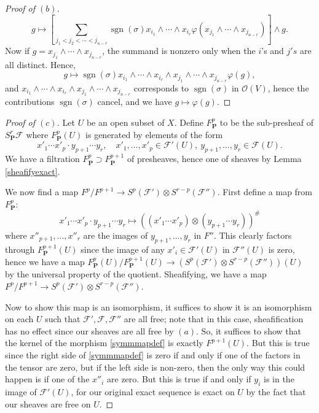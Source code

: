 \documentclass[10pt]{article}
\theoremstyle{definition}
\theoremstyle{remark}
\numberwithin{equation}{section}
\numberwithin{figure}{subsubsection}
\DeclareMathOperator{\sgn}{sgn}
\newcommand{\FF}{\mathscr{F}}
\newcommand{\OO}{\mathcal{O}}
\newcommand{\PP}{\mathbf{P}}
\begin{document}
\begin{proof}[Proof of $(b)$]
\begin{equation*}
    g \mapsto \left[ \sum_{j_1 < j_2 < \cdots < j_{n-r}}\sgn(\sigma)x_{i_1}\wedge\cdots\wedge x_{i_r}\varphi(x_{j_1} \wedge \cdots \wedge x_{j_{n-r}}) \right] \wedge g.
  \end{equation*}
  Now if $g = x_{j_1} \wedge \cdots \wedge x_{j_{n-r}}$, the summand is nonzero only when the $i$'s and $j's$ are all distinct. Hence,
  \begin{equation*}
    g \mapsto \sgn(\sigma) x_{i_1}\wedge\cdots\wedge x_{i_r} \wedge x_{j_1} \wedge \cdots \wedge x_{j_{n-r}} \varphi(g),
  \end{equation*}
  and $x_{i_1}\wedge\cdots\wedge x_{i_r} \wedge x_{j_1} \wedge \cdots \wedge x_{j_{n-r}}$ corresponds to $\sgn(\sigma)$ in $\OO(V)$, hence the contributions $\sgn(\sigma)$ cancel, and we have $g \mapsto \varphi(g)$.
\end{proof}
\begin{proof}[Proof of $(c)$]
  Let $U$ be an open subset of $X$. Define $F^p_{\PP}$ to be the sub-presheaf of $S^r_\PP \FF$ where $F^p_\PP(U)$ is generated by elements of the form
  \begin{equation*}
    x'_1 \cdots x'_p \cdot y_{p+1} \cdots y_r, \quad x'_1,\ldots,x'_p \in \FF'(U),~y_{p+1},\ldots,y_r \in \FF(U).
  \end{equation*}
  We have a filtration $F^p_\PP \supset F^{p+1}_\PP$ of presheaves, hence one of sheaves by Lemma \ref{sheafifyexact}.
  \par We now find a map $F^p/F^{p+1} \to S^p(\FF') \otimes S^{r-p}(\FF'')$. First define a map from $F^p_\PP$:
  \begin{equation}\label{symmmapdef}
    x'_1 \cdots x'_p \cdot y_{p+1} \cdots y_r \mapsto \left((x'_1 \cdots x'_p) \otimes (y_{p+1} \cdots y_r)\right)^\#
  \end{equation}
  where $x''_{p+1},\ldots,x''_r$ are the images of $y_{p+1},\ldots,y_r$ in $F''$. This clearly factors through $F_\PP^{p+1}(U)$ since the image of any $x'_i \in \FF'(U)$ in $\FF''(U)$ is zero, hence we have a map $F^p_\PP(U)/F^{p+1}_\PP(U) \to (S^p(\FF') \otimes S^{r-p}(\FF''))(U)$ by the universal property of the quotient. Sheafifying, we have a map $F^p/F^{p+1} \to S^p(\FF') \otimes S^{r-p}(\FF'')$.
  \par Now to show this map is an isomorphism, it suffices to show it is an isomorphism on each $U$ such that $\FF',\FF,\FF''$ are all free; note that in this case, sheafification has no effect since our sheaves are all free by $(a)$. So, it suffices to show that the kernel of the morphism \eqref{symmmapdef} is exactly $F^{p+1}(U)$. But this is true since the right side of \eqref{symmmapdef} is zero if and only if one of the factors in the tensor are zero, but if the left side is non-zero, then the only way this could happen is if one of the $x''_i$ are zero. But this is true if and only if $y_i$ is in the image of $\FF'(U)$, for our original exact sequence is exact on $U$ by the fact that our sheaves are free on $U$.
\end{proof}
\end{document}
